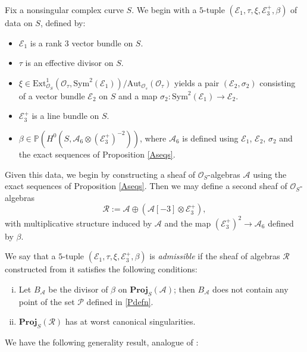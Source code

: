 \documentclass{amsart}
\begin{document}
Fix a nonsingular complex curve $S$. We begin with a $5$-tuple $({\mathcal{E}}_1,\tau,\xi,{\mathcal{E}}_3^+,\beta)$ of data on $S$, defined by:
\begin{itemize}
\item ${\mathcal{E}}_1$ is a rank $3$ vector bundle on $S$.
\item $\tau$ is an effective divisor on $S$.
\item $\xi \in \mathrm{Ext}_{{\mathcal{O}}_S}^1({\mathcal{O}}_{\tau}, {\mathrm{Sym}}^2({\mathcal{E}}_1))/\mathrm{Aut}_{{\mathcal{O}}_s}({\mathcal{O}}_{\tau})$ yields a pair $({\mathcal{E}}_2,\sigma_2)$ consisting of a vector bundle ${\mathcal{E}}_2$ on $S$ and a map $\sigma_2\colon {\mathrm{Sym}}^2({\mathcal{E}}_1) \to {\mathcal{E}}_2$.
\item ${\mathcal{E}}_3^+$ is a line bundle on $S$.
\item $\beta \in {\mathbb{P}}(H^0(S, {\mathcal{A}}_6 \otimes ({\mathcal{E}}_3^+)^{-2}))$, where ${\mathcal{A}}_6$ is defined using ${\mathcal{E}}_1$, ${\mathcal{E}}_2$, $\sigma_2$ and the exact sequences of Proposition \ref{Aseqs}.
\end{itemize}

Given this data, we begin by constructing a sheaf of ${\mathcal{O}}_S$-algebras ${\mathcal{A}}$ using the exact sequences of Proposition \ref{Aseqs}. Then we may define a second sheaf of ${\mathcal{O}}_S$-algebras
\[ {\mathcal{R}} := {\mathcal{A}} \oplus ({\mathcal{A}}[-3] \otimes {\mathcal{E}}_3^+),\]
with multiplicative structure induced by ${\mathcal{A}}$ and the map $({\mathcal{E}}_3^+)^2 \to {\mathcal{A}}_6$ defined by $\beta$.

\begin{defn} \label{admissdefn} We say that a $5$-tuple $({\mathcal{E}}_1,\tau,\xi,{\mathcal{E}}_3^+,\beta)$ is \emph{admissible} if the sheaf of algebras ${\mathcal{R}}$ constructed from it satisfies the following conditions:
\begin{enumerate}[(i)]
\item Let $B_{\mathcal{A}}$ be the divisor of $\beta$ on $\mathbf{Proj}_S({\mathcal{A}})$; then $B_{\mathcal{A}}$ does not contain any point of the set ${\mathcal{P}}$ defined in \ref{Pdefn}.
\item $\mathbf{Proj}_S({\mathcal{R}})$ has at worst canonical singularities. 
\end{enumerate}
\end{defn}

We have the following generality result, analogue of \cite[Theorem 4.13]{flgi}:
\end{document}

